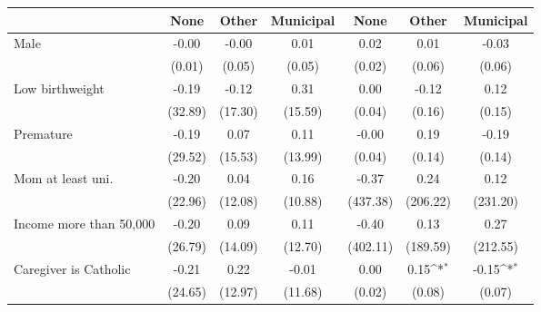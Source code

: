 {
\def\sym#1{\ifmmode^{#1}\else\(^{#1}\)\fi}
\begin{tabular}{l*{6}{c}}
\toprule
                    &\multicolumn{1}{c}{None}&\multicolumn{1}{c}{Other}&\multicolumn{1}{c}{Municipal}&\multicolumn{1}{c}{None}&\multicolumn{1}{c}{Other}&\multicolumn{1}{c}{Municipal}\\
\midrule
Male                &       -0.00         &       -0.00         &        0.01         &        0.02         &        0.01         &       -0.03         \\
                    &      (0.01)         &      (0.05)         &      (0.05)         &      (0.02)         &      (0.06)         &      (0.06)         \\
\addlinespace
Low birthweight     &       -0.19         &       -0.12         &        0.31         &        0.00         &       -0.12         &        0.12         \\
                    &     (32.89)         &     (17.30)         &     (15.59)         &      (0.04)         &      (0.16)         &      (0.15)         \\
\addlinespace
Premature     &       -0.19         &        0.07         &        0.11         &       -0.00         &        0.19         &       -0.19         \\
                    &     (29.52)         &     (15.53)         &     (13.99)         &      (0.04)         &      (0.14)         &      (0.14)         \\
\addlinespace
Mom at least uni.  &       -0.20         &        0.04         &        0.16         &       -0.37         &        0.24         &        0.12         \\
                    &     (22.96)         &     (12.08)         &     (10.88)         &    (437.38)         &    (206.22)         &    (231.20)         \\
\addlinespace
Income more than 50,000  &       -0.20         &        0.09         &        0.11         &       -0.40         &        0.13         &        0.27         \\
                    &     (26.79)         &     (14.09)         &     (12.70)         &    (402.11)         &    (189.59)         &    (212.55)         \\
\addlinespace
Caregiver is Catholic&       -0.21         &        0.22         &       -0.01         &        0.00         &        0.15\sym{*}  &       -0.15\sym{*}  \\
                    &     (24.65)         &     (12.97)         &     (11.68)         &      (0.02)         &      (0.08)         &      (0.07)         \\

\end{tabular}}
